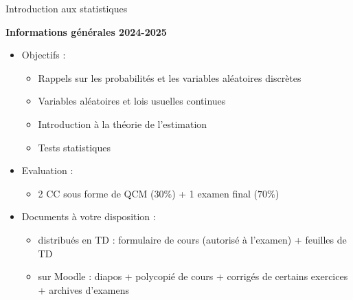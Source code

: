 \documentclass{beamer}
\begin{document}


\begin{frame}{Introduction aux statistiques}{}

\begin{center}{\bf \Large Informations générales 2024-2025} \end{center}
\vspace{0.2cm}

\begin{itemize}
\item \large Objectifs : 
\begin{itemize}
\item Rappels sur les probabilités et les variables aléatoires discrètes
\item Variables aléatoires et lois usuelles continues
\item Introduction à la théorie de l'estimation 
\item Tests statistiques
\end{itemize}



\item Evaluation : 
\begin{itemize}
\item 2 CC sous forme de QCM ($30\%$) + 1 examen final ($70\%$) \\
\end{itemize}

\item Documents à votre disposition : 
\begin{itemize}
\item distribués en TD : formulaire de cours (autorisé à l'examen) + feuilles de TD
\item sur Moodle : diapos + polycopié de cours + corrigés de certains exercices + archives d'examens 
\end{itemize}
\end{itemize}

\end{frame}

\end{document}
